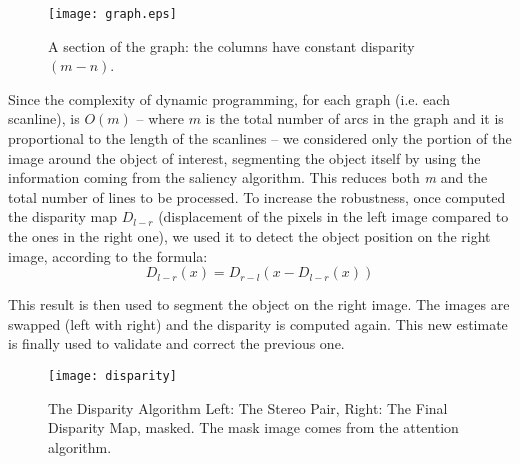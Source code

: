 \begin{figure}
	\centering
		\texttt{[image: graph.eps]}
	\caption{A section of the graph: the columns have constant disparity $(m-n)$.}
	\label{fig-graph}
\end{figure}

Since the complexity of dynamic programming, for each graph (i.e. each scanline), is $O(m)$ -- where $m$ is the total number of arcs in the graph and it is proportional to the length of the scanlines -- we considered only the portion of the image around the object of interest, segmenting the object itself by using the information coming from the saliency algorithm. This reduces both {\em m} and the total number of lines to be processed. To increase the robustness, once computed the disparity map $D_{l-r}$ (displacement of the pixels in the left image compared to the ones in the right one), we used it to detect the object position on the right image, according to the formula: 
\begin{equation}D_{l-r}(x)=D_{r-l}(x-D_{l-r}(x))\end{equation}

This result is then used to segment the object on the right image. The images are swapped (left with right) and the disparity is computed again. This new estimate is finally used to validate and correct the previous one.

\begin{figure}
\centering
\texttt{[image: disparity]}
\caption{The Disparity Algorithm  Left: The Stereo Pair, Right: The Final Disparity Map, masked. The mask image comes from the attention algorithm.}
\label{fig-disparity}
\end{figure}

